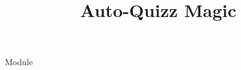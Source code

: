 \documentclass[12pt, LuaLaTeX]{article}
\title{Auto-Quizz Magic\\\QuizzName}
\author{\uauthor}
\def\QuizzName{Module\lessonID}
\begin{document}
\maketitle

\begin{quiz}{\QuizzName}

\ubodyquizz

\end{quiz}
\end{document}
